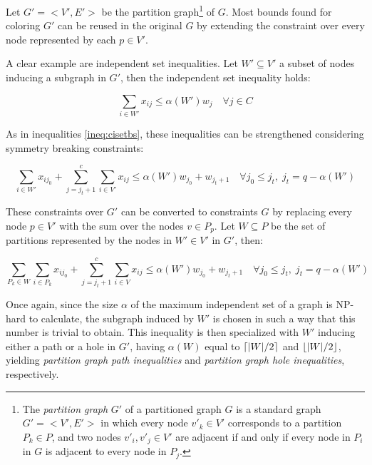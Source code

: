 Let $G' = <V',E'>$ be the partition graph\footnote{The \textit{partition graph} $G'$ of a partitioned graph $G$ is a standard graph $G'=<V',E'>$ in which every node $v'_k \in V'$ corresponds to a partition $P_k \in P$, and two nodes $v'_i,v'_j \in V'$ are adjacent if and only if every node in $P_i$ in $G$ is adjacent to every node in $P_j$.} of $G$. Most bounds found for coloring $G'$ can be reused in the original $G$ by extending the constraint over every node represented by each $p \in V'$.

A clear example are independent set inequalities. Let $W' \subseteq V'$ a subset of nodes inducing a subgraph in $G'$, then the independent set inequality holds:

\begin{equation}
\label{ineq:gpiset}
\sum _{i \in W'} x_{ij} \leq \alpha(W') w_{j} \quad \forall j \in C
\end{equation}

As in inequalities \ref{ineq:cisetbs}, these inequalities can be strengthened considering symmetry breaking constraints:

\begin{equation}
\label{ineq:gpisetbs}
\sum_{i \in W'} x_{ij_0} + \sum ^c _{j = j_t + 1} \sum _{i \in V'} x_{ij} \leq \alpha(W') w_{j_0} + w_{j_t + 1} \quad \forall j_0 \leq j_t, \; j_t = q - \alpha(W')
\end{equation}

These constraints over $G'$ can be converted to constraints $G$ by replacing every node $p \in V'$ with the sum over the nodes $v \in P_p$. Let $W \subseteq P$ be the set of partitions represented by the nodes in $W' \in V'$ in $G'$, then:

\begin{equation}
\label{ineq:gpisetbsg}
\sum_{P_k \in W} \sum_{i \in P_k} x_{ij_0} + \sum ^c _{j = j_t + 1} \sum _{i \in V} x_{ij} \leq \alpha(W') w_{j_0} + w_{j_t + 1} \quad \forall j_0 \leq j_t, \; j_t = q - \alpha(W')
\end{equation}

Once again, since the size $\alpha$ of the maximum independent set of a graph is NP-hard to calculate, the subgraph induced by $W'$ is chosen in such a way that this number is trivial to obtain. This inequality is then specialized with $W'$ inducing either a path or a hole in $G'$, having $\alpha(W)$ equal to $\left\lceil |W| / 2 \right\rceil$ and $\left\lfloor |W| / 2 \right\rfloor$, yielding \textit{partition graph path inequalities} and \textit{partition graph hole inequalities}, respectively.

